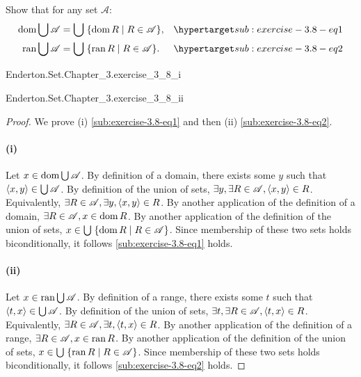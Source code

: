 \documentclass{report}
\begin{document}
  Show that for any set $\mathscr{A}$:
    \begin{align}
      \dom{\bigcup{\mathscr{A}}}
        & = \bigcup\;\{ \dom{R} \mid R \in \mathscr{A} \},
        & \hyperlabel{sub:exercise-3.8-eq1} \\
      \ran{\bigcup{\mathscr{A}}}
        & = \bigcup\;\{ \ran{R} \mid R \in \mathscr{A} \}.
        & \hyperlabel{sub:exercise-3.8-eq2}
    \end{align}

    {Enderton.Set.Chapter\_3.exercise\_3\_8\_i}

    {Enderton.Set.Chapter\_3.exercise\_3\_8\_ii}

  \begin{proof}
    We prove (i) \eqref{sub:exercise-3.8-eq1} and then (ii)
      \eqref{sub:exercise-3.8-eq2}.

    \paragraph{(i)}%

      Let $x \in \mathop{\text{dom}}{\bigcup{\mathscr{A}}}$.
      By definition of a domain, there exists some $y$ such that
        $\left< x, y \right> \in \bigcup{\mathscr{A}}$.
      By definition of the union of sets,
        $\exists y, \exists R \in \mathscr{A}, \left< x, y \right> \in R$.
      Equivalently,
        $\exists R \in \mathscr{A}, \exists y, \left< x, y \right> \in R$.
      By another application of the definition of a domain,
        $\exists R \in \mathscr{A}, x \in \mathop{\text{dom}}{R}$.
      By another application of the definition of the union of sets,
        $x \in \bigcup\;\{ \mathop{\text{dom}}{R} \mid R \in \mathscr{A} \}$.
      Since membership of these two sets holds biconditionally, it follows
        \eqref{sub:exercise-3.8-eq1} holds.

    \paragraph{(ii)}%

      Let $x \in \mathop{\text{ran}}{\bigcup{\mathscr{A}}}$.
      By definition of a range, there exists some $t$ such that
        $\left< t, x \right> \in \bigcup{\mathscr{A}}$.
      By definition of the union of sets,
        $\exists t, \exists R \in \mathscr{A}, \left< t, x \right> \in R$.
      Equivalently,
        $\exists R \in \mathscr{A}, \exists t, \left< t, x \right> \in R$.
      By another application of the definition of a range,
        $\exists R \in \mathscr{A}, x \in \mathop{\text{ran}}{R}$.
      By another application of the definition of the union of sets,
        $x \in \bigcup\;\{ \mathop{\text{ran}}{R} \mid R \in \mathscr{A} \}$.
      Since membership of these two sets holds biconditionally, it follows
        \eqref{sub:exercise-3.8-eq2} holds.

  \end{proof}
\end{document}
